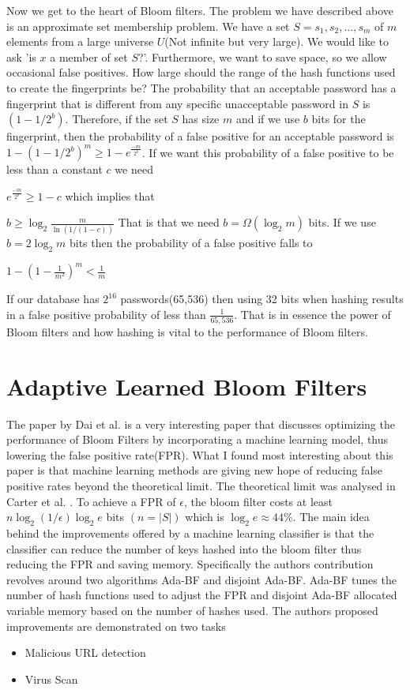 \documentclass[MScCS]{uccthesis}
\begin{document}
Now we get to the heart of Bloom filters. The problem we have described above is an approximate set membership problem. We have a set $S = {s_1, s_2, ..., s_m}$ of $m$ elements from a large universe $U$(Not infinite but very large). We would like to ask 'is $x$ a member of set $S$?'. Furthermore, we want to save space, so we allow occasional false positives. How large should the range of the hash functions used to create the fingerprints be? The probability that an acceptable password has a fingerprint that is different from any specific unacceptable password in $S$ is $(1-1/2^b)$. Therefore,  if the set $S$ has size $m$ and if we use $b$ bits for the fingerprint, then the probability of a false positive for an acceptable password is $1 - (1-1/2^b)^m \geq 1 - e^\frac{-m}{2^b}$. If we want this probability of a false positive to be less than a constant $c$ we need

$e ^\frac{-m}{2^b} \geq 1 - c$ which implies that

$b \geq \log_2 \frac{m}{\ln(1/(1-c))}$ That is that we need $b = \Omega (\log_2 m)$ bits. If we use $b = 2\log_2 m $ bits then the probability of a false positive falls to

$1 - (1 - \frac{1}{m^2})^m < \frac{1}{m}$

If our database has $2^{16}$ passwords(65,536) then using 32 bits when hashing results in a false positive probability of less than $\frac{1}{65,536}$. That is in essence the power of Bloom filters and how hashing is vital to the performance of Bloom filters.


\section{Adaptive Learned Bloom Filters}
The paper by Dai et al. \cite{dai2019adaptive} is a very interesting paper that discusses optimizing the performance of Bloom Filters by incorporating a machine learning model, thus lowering the false positive rate(FPR). What I found most interesting about this paper is that machine learning methods are giving new hope of reducing false positive rates beyond the theoretical limit. The theoretical limit was analysed in Carter et al. \cite{carter1978exact}. To achieve a FPR of $ \epsilon $, the bloom filter costs at least $ n \log_2 (1/\epsilon)\log_2 e$ bits $(n = |S|)$ which is $\log_2 e \approx 44\%$. The main idea behind the improvements offered by a machine learning classifier is that the classifier can reduce the number of keys hashed into the bloom filter thus reducing the FPR and saving memory. Specifically the authors contribution revolves around two algorithms Ada-BF and disjoint Ada-BF. Ada-BF tunes the number of hash functions used to adjust the FPR and disjoint Ada-BF allocated variable memory based on the number of hashes used. The authors proposed improvements are demonstrated on two tasks
\begin{itemize}
    \item Malicious URL detection
    \item Virus Scan
\end{itemize}
\end{document}
